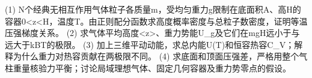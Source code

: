 (1) N个经典无相互作用气体粒子各质量m，受均匀重力g限制在底面积A、高H的容器0<z<H，温度T。由正则配分函数求高度概率密度与总粒子数密度，证明等温压强梯度关系。
(2) 求气体平均高度<z>、重力势能U_g及它们在mgH远小于与远大于kBT的极限。
(3) 加上三维平动动能，求总内能U(T)和恒容热容C_V；解释为什么重力对热容贡献在两极限不同。
(4) 求底面和顶面压强差，严格用整个气柱重量核验力平衡；讨论局域理想气体、固定几何容器及重力势零点的假设。
